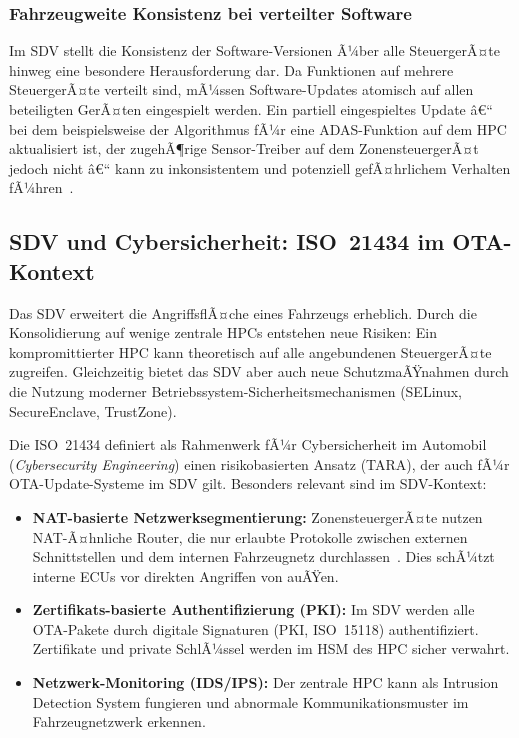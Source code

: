 ﻿\documentclass[12pt,a4paper,twoside]{article}
\begin{document}
\subsubsection{Fahrzeugweite Konsistenz bei verteilter Software}

Im SDV stellt die Konsistenz der Software-Versionen Ã¼ber alle SteuergerÃ¤te
hinweg eine besondere Herausforderung dar. Da Funktionen auf mehrere SteuergerÃ¤te
verteilt sind, mÃ¼ssen Software-Updates atomisch auf allen beteiligten GerÃ¤ten
eingespielt werden. Ein partiell eingespieltes Update â€“ bei dem beispielsweise
der Algorithmus fÃ¼r eine ADAS-Funktion auf dem HPC aktualisiert ist, der
zugehÃ¶rige Sensor-Treiber auf dem ZonensteuergerÃ¤t jedoch nicht â€“ kann zu
inkonsistentem und potenziell gefÃ¤hrlichem Verhalten fÃ¼hren~\cite{halder2020secure}.

\subsection{SDV und Cybersicherheit: ISO~21434 im OTA-Kontext}
\label{subsec:sdv_cybersecurity}

Das SDV erweitert die AngriffsflÃ¤che eines Fahrzeugs erheblich. Durch die
Konsolidierung auf wenige zentrale HPCs entstehen neue Risiken: Ein kompromittierter
HPC kann theoretisch auf alle angebundenen SteuergerÃ¤te zugreifen. Gleichzeitig
bietet das SDV aber auch neue SchutzmaÃŸnahmen durch die Nutzung moderner
Betriebssystem-Sicherheitsmechanismen (SELinux, SecureEnclave, TrustZone).

Die ISO~21434 definiert als Rahmenwerk fÃ¼r Cybersicherheit im Automobil
(\textit{Cybersecurity Engineering}) einen risikobasierten Ansatz (TARA), der
auch fÃ¼r OTA-Update-Systeme im SDV gilt. Besonders relevant sind im SDV-Kontext:

\begin{itemize}
  \item \textbf{NAT-basierte Netzwerksegmentierung:} ZonensteuergerÃ¤te nutzen
    NAT-Ã¤hnliche Router, die nur erlaubte Protokolle zwischen externen
    Schnittstellen und dem internen Fahrzeugnetz durchlassen~\cite{schneider2026ladekomm}.
    Dies schÃ¼tzt interne ECUs vor direkten Angriffen von auÃŸen.
  \item \textbf{Zertifikats-basierte Authentifizierung (PKI):} Im SDV werden
    alle OTA-Pakete durch digitale Signaturen (PKI, ISO~15118) authentifiziert.
    Zertifikate und private SchlÃ¼ssel werden im HSM des HPC sicher verwahrt.
  \item \textbf{Netzwerk-Monitoring (IDS/IPS):} Der zentrale HPC kann als
    Intrusion Detection System fungieren und abnormale Kommunikationsmuster
    im Fahrzeugnetzwerk erkennen.
\end{itemize}
\end{document}
